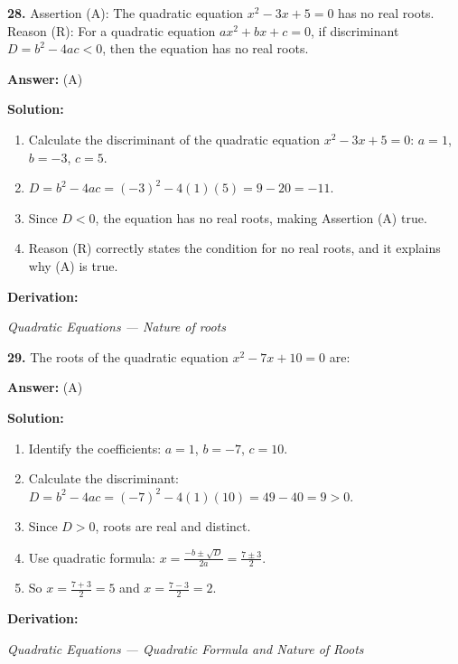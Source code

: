 \documentclass[12pt,a4paper]{exam}
\newcommand{\fitmath}[1]{%
  \sbox{\schmathbox}{$\displaystyle #1$}%
  \ifdim\wd\schmathbox>\linewidth
    \resizebox{\linewidth}{!}{\usebox{\schmathbox}}%
  \else
    \usebox{\schmathbox}%
  \fi}
\begin{document}
\begin{questions}
\question \textbf{28.} Assertion (A): The quadratic equation $x^2 - 3x + 5 = 0$ has no real roots.
Reason (R): For a quadratic equation $ax^2+bx+c=0$, if discriminant $D = b^2 - 4ac < 0$, then the equation has no real roots.

\textbf{Answer:}
(A)

\textbf{Solution:}
\begin{enumerate}
  \item Calculate the discriminant of the quadratic equation $x^2 - 3x + 5 = 0$: $a=1$, $b=-3$, $c=5$.
  \item $D = b^2 - 4ac = (-3)^2 - 4(1)(5) = 9 - 20 = -11$.
  \item Since $D < 0$, the equation has no real roots, making Assertion (A) true.
  \item Reason (R) correctly states the condition for no real roots, and it explains why (A) is true.
\end{enumerate}
\textbf{Derivation:}
\begin{center}
\fitmath{D = (-3)^2 - 4(1)(5) = 9 - 20 = -11 < 0}
\end{center}
\hfill \textit{Quadratic Equations — Nature of roots}
\vspace{0.3cm}

\question \textbf{29.} The roots of the quadratic equation $x^2 - 7x + 10 = 0$ are:

\textbf{Answer:}
(A)

\textbf{Solution:}
\begin{enumerate}
  \item Identify the coefficients: $a = 1$, $b = -7$, $c = 10$.
  \item Calculate the discriminant: $D = b^2 - 4ac = (-7)^2 - 4(1)(10) = 49 - 40 = 9 > 0$.
  \item Since $D > 0$, roots are real and distinct.
  \item Use quadratic formula: $x = \frac{-b \pm \sqrt{D}}{2a} = \frac{7 \pm 3}{2}$.
  \item So $x = \frac{7+3}{2} = 5$ and $x = \frac{7-3}{2} = 2$.
\end{enumerate}
\textbf{Derivation:}
\begin{center}
\fitmath{\begin{aligned}
x = \frac{7 \pm \sqrt{49 - 40}}{2} = \frac{7 \pm 3}{2} \\
\Rightarrow x = 5, 2
\end{aligned}}
\end{center}
\hfill \textit{Quadratic Equations — Quadratic Formula and Nature of Roots}
\vspace{0.3cm}


\end{questions}
\end{document}
